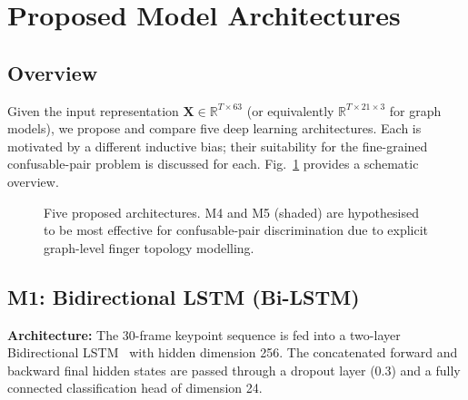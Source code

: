 \documentclass[conference]{IEEEtran}
\begin{document}
\section{Proposed Model Architectures}
\label{sec:models}

\subsection{Overview}

Given the input representation $\mathbf{X} \in \mathbb{R}^{T \times 63}$ (or
equivalently $\mathbb{R}^{T \times 21 \times 3}$ for graph models), we propose
and compare five deep learning architectures. Each is motivated by a different
inductive bias; their suitability for the fine-grained confusable-pair problem
is discussed for each. Fig.~\ref{fig:models} provides a schematic overview.

\begin{figure}[htbp]
\centering
{}
\caption{Five proposed architectures. M4 and M5 (shaded) are hypothesised to be
most effective for confusable-pair discrimination due to explicit graph-level
finger topology modelling.}
\label{fig:models}
\end{figure}

\subsection{M1: Bidirectional LSTM (Bi-LSTM)}

\textbf{Architecture:} The 30-frame keypoint sequence is fed into a two-layer
Bidirectional LSTM~\cite{hochreiter1997} with hidden dimension 256. The
concatenated forward and backward final hidden states are passed through a
dropout layer (0.3) and a fully connected classification head of dimension 24.
\end{document}
